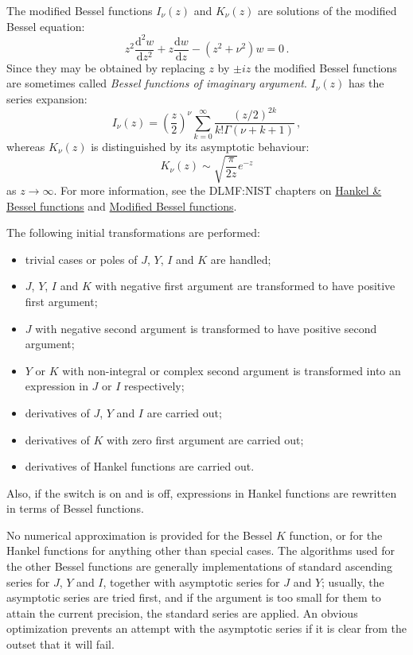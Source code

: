The modified Bessel functions $I_\nu(z)$ and $K_\nu(z)$ are solutions of the
modified Bessel equation:
\[z^2\frac{\mathrm{d}^2w}{\mathrm{d}z^2}+z\frac{\mathrm{d}w}{\mathrm{d}z} -
(z^2 + \nu^2)w = 0\,.\]
Since they may be obtained by replacing $z$ by $\pm i z$ the modified Bessel
functions are sometimes called \emph{Bessel functions  of imaginary argument}.
$I_\nu(z)$ has the series expansion:
\[I_\nu(z) = \left(\frac{z}{2}\right)^\nu \sum_{k=0}^\infty \frac{(z/2)^{2k}}{k!\Gamma(\nu+k+1)}\,,\]
whereas $K_\nu(z)$ is distinguished by its asymptotic behaviour:
\[K_\nu(z) \sim \sqrt{\frac{\pi}{2 z}}e^{-z}\]
as $z\rightarrow \infty$. For more information, see the DLMF:NIST chapters on
\href{https://dlmf.nist.gov/10.2}{Hankel \& Bessel functions} and \href{https://dlmf.nist.gov/10.25}{Modified Bessel functions}.


The following initial transformations are performed:

\begin{itemize}
\item trivial cases or poles of $J$, $Y$, $I$ and $K$ are handled;
\item $J$, $Y$, $I$ and $K$ with negative first argument are transformed to have
positive first argument;
\item $J$ with negative second argument is transformed to have positive second
argument;
\item $Y$ or $K$ with non-integral or complex second argument is transformed
into an expression in $J$ or $I$ respectively;
\item derivatives of $J$, $Y$ and $I$ are carried out;
\item derivatives of $K$ with zero first argument are carried out;
\item derivatives of Hankel functions are carried out.
\end{itemize}
Also, if the  switch is on and  is off,
expressions in Hankel functions are rewritten in terms of Bessel functions.

No numerical approximation is provided for the Bessel $K$ function, or
for the Hankel functions for anything other than special cases.  The
algorithms used for the other Bessel functions are generally
implementations of standard ascending series for $J$, $Y$ and $I$,
together with asymptotic series for $J$ and $Y$; usually, the
asymptotic series are tried first, and if the argument is too small
for them to attain the current precision, the standard series are
applied.  An obvious optimization prevents an attempt with the
asymptotic series if it is clear from the outset that it will fail.

